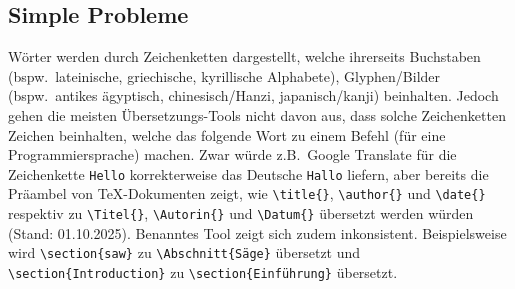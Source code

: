 \subsection{Simple Probleme}
Wörter werden durch Zeichenketten dargestellt, welche ihrerseits Buchstaben (bspw.\ lateinische, griechische, kyrillische Alphabete), Glyphen/Bilder (bspw.\ antikes ägyptisch, chinesisch/Hanzi, japanisch/kanji) beinhalten. Jedoch gehen die meisten Übersetzungs-Tools nicht davon aus, dass solche Zeichenketten Zeichen beinhalten, welche das folgende Wort zu einem Befehl (für eine Programmiersprache) machen. Zwar würde z.B.\ Google Translate für die Zeichenkette \texttt{Hello} korrekterweise das Deutsche \texttt{Hallo} liefern, aber bereits die Präambel von \TeX{}-Dokumenten zeigt, wie \verb|\title{}|, \verb|\author{}| und \verb|\date{}| respektiv zu \verb|\Titel{}|, \verb|\Autorin{}| und \verb|\Datum{}| übersetzt werden würden (Stand: 01.10.2025). Benanntes Tool zeigt sich zudem inkonsistent. Beispielsweise wird \verb|\section{saw}| zu \verb|\Abschnitt{Säge}| übersetzt und \verb|\section{Introduction}| zu \verb|\section{Einführung}| übersetzt.\\\noindent


